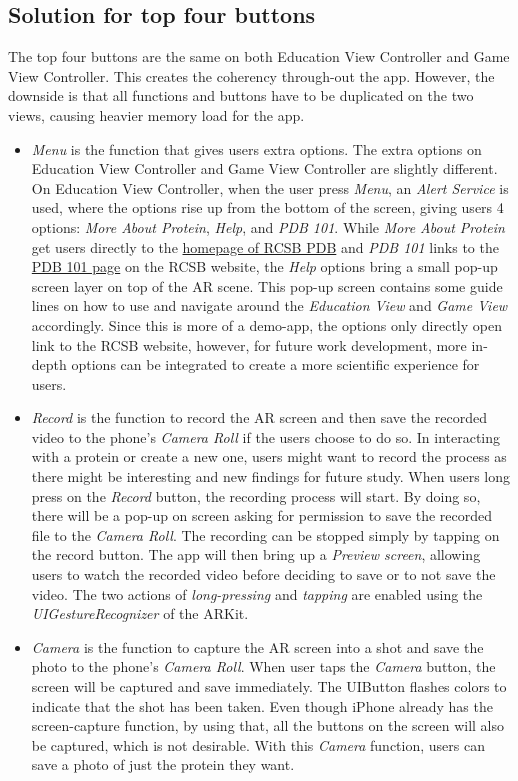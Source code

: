 \subsection{Solution for top four buttons}
The top four buttons are the same on both Education View Controller and Game View Controller. This creates the coherency through-out the app. However, the downside is that all functions and buttons have to be duplicated on the two views, causing heavier memory load for the app. 
\begin{itemize}
	\item \emph{Menu} is the function that gives users extra options. The extra options on Education View Controller and Game View Controller are slightly different. On Education View Controller, when the user press \emph{Menu}, an \emph{Alert Service} is used, where the options rise up from the bottom of the screen, giving users 4 options: \emph{More About Protein}, \emph{Help}, and \emph{PDB 101}. While \emph{More About Protein} get users directly to the \href{http://rcsb.org}{homepage of RCSB PDB} and \emph{PDB 101} links to the \href{http://pdb101.rcsb.org}{PDB 101 page} on the RCSB website, the \emph{Help} options bring a small pop-up screen layer on top of the AR scene. This pop-up screen contains some guide lines on how to use and navigate around the \emph{Education View} and \emph{Game View} accordingly. 
Since this is more of a demo-app, the options only directly open link to the RCSB website, however, for future work development, more in-depth options can be integrated to create a more scientific experience for users. 
	\item \emph{Record} is the function to record the AR screen and then save the recorded video to the phone’s \emph{Camera Roll} if the users choose to do so. In interacting with a protein or create a new one, users might want to record the process as there might be interesting and new findings for future study. When users long press on the \emph{Record} button, the recording process will start. By doing so, there will be a pop-up on screen asking for permission to save the recorded file to the \emph{Camera Roll}. The recording can be stopped simply by tapping on the record button. The app will then bring up a \emph{Preview screen}, allowing users to watch the recorded video before deciding to save or to not save the video. The two actions of \emph{long-pressing} and \emph{tapping} are enabled using the \emph{UIGestureRecognizer} of the ARKit. 
	\item \emph{Camera} is the function to capture the AR screen into a shot and save the photo to the phone’s \emph{Camera Roll}. When user taps the \emph{Camera} button, the screen will be captured and save immediately. The UIButton flashes colors to indicate that the shot has been taken.  Even though iPhone already has the screen-capture function, by using that, all the buttons on the screen will also be captured, which is not desirable. With this \emph{Camera} function, users can save a photo of just the protein they want. 

\end{itemize}

